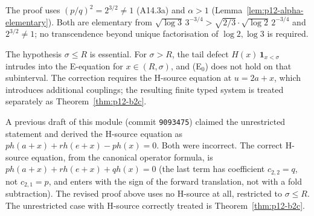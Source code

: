 \begin{remark}
\label{rem:p12-b2b-inputs}
The proof uses $(p/q)^2 = 2^{3/2} \ne 1$ (A14.3a) and
$\alpha > 1$ (Lemma~\ref{lem:p12-alpha-elementary}).  Both are
elementary from $\sqrt{\log 3}\, 3^{-3/4} > \sqrt{2/3}\cdot\sqrt{\log 2}\, 2^{-3/4}$
and $2^{3/2} \ne 1$; no transcendence beyond unique factorisation of
$\log 2, \log 3$ is required.
\end{remark}

\begin{remark}\label{rem:p12-b2b-restricted-scope}
The hypothesis $\sigma \le R$ is essential.  For $\sigma > R$, the
tail defect $H(x)\,\mathbf 1_{x<\sigma}$ intrudes into the E-equation
for $x \in (R, \sigma)$, and (E$_0$) does not hold on
that subinterval.  The correction requires the H-source equation at
$u = 2a + x$, which introduces additional couplings; the resulting
finite typed system is treated separately as
Theorem~\ref{thm:p12-b2c}.
\end{remark}

\begin{remark}
\label{rem:p12-b2b-correction}
A previous draft of this module (commit \texttt{9093475}) claimed the
unrestricted statement and derived the H-source equation as
$p h(a+x) + r h(e+x) - p h(x) = 0$.  Both were incorrect.  The
correct H-source equation, from the canonical operator formula, is
$p h(a+x) + r h(e+x) + q h(x) = 0$ (the last term has coefficient $c_{2,2}
= q$, not $c_{2,1} = p$, and enters with the sign of the forward
translation, not with a fold subtraction).  The revised proof above
uses no H-source at all, restricted to $\sigma \le R$.  The
unrestricted case with H-source correctly treated is
Theorem~\ref{thm:p12-b2c}.
\end{remark}
